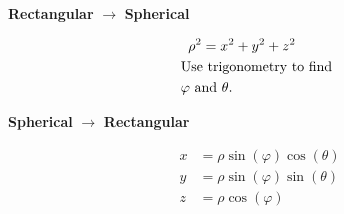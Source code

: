 \documentclass[../mathNotesPreamble]{subfiles}
\begin{document}
  \begin{thmBox*}
    \vspace*{0.5\baselineskip}
    \begin{minipage}{0.5\linewidth}
      \begin{center}
        \textbf{Rectangular} $\rightarrow$ \textbf{Spherical}
      \end{center}
      \begin{align*}
        \rho^2&=x^2+y^2+z^2\\
        &\hspace*{-15pt}\textnormal{Use trigonometry to find}\\
        &\hspace*{-15pt}\varphi \textnormal{ and } \theta.
      \end{align*}
    \end{minipage}%
    \begin{minipage}{0.5\linewidth}
      \begin{center}
        \textbf{Spherical} $\rightarrow$ \textbf{Rectangular}
      \end{center}
      \begin{align*}
        x&=\rho\sin(\varphi)\cos(\theta)\\
        y&=\rho\sin(\varphi)\sin(\theta)\\
        z&=\rho\cos(\varphi)
      \end{align*}
    \end{minipage}%
  \end{thmBox*}
\end{document}
